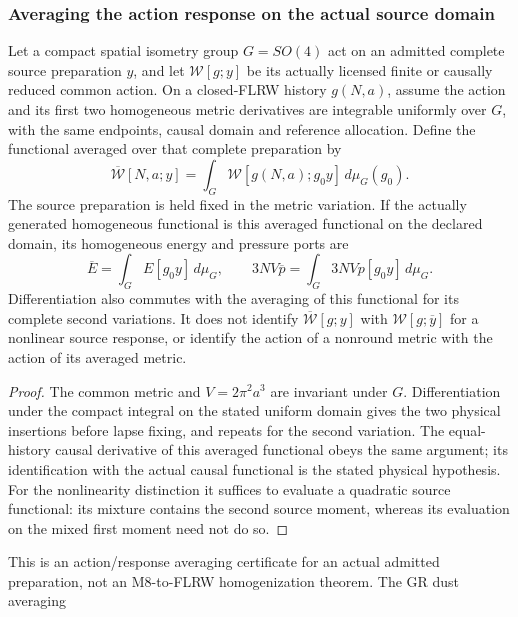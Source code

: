 \documentclass[12pt,a4paper]{article}
\begin{document}
\subsubsection{Averaging the action response on the actual source domain}
\begin{proposition}
\label{p8:prop:v2210-lit-averaging-ports}
Let a compact spatial isometry group $G=SO(4)$ act on an admitted complete
source preparation $y$, and let $\mathcal W[g;y]$ be its actually licensed
finite or causally reduced common action. On a closed-FLRW history $g(N,a)$,
assume the action and its first two homogeneous metric derivatives are
integrable uniformly over $G$, with the same endpoints, causal domain and
reference allocation. Define the functional averaged over that complete
preparation by
\[
 \overline{\mathcal W}[N,a;y]
       =\int_G\mathcal W[g(N,a);g_0y]\,d\mu_G(g_0).
\]
The source preparation is held fixed in the metric variation. If the
actually generated homogeneous functional is this averaged functional on
the declared domain, its homogeneous energy and pressure ports are
\begin{equation}
\label{p8:eq:v2210-lit-averaged-ports}
 \boxed{\overline E=\int_GE[g_0y]\,d\mu_G,
 \qquad 3NV\overline p=\int_G3NVp[g_0y]\,d\mu_G.}
\end{equation}
Differentiation also commutes with the averaging of this functional for
its complete second variations. It does
not identify $\overline{\mathcal W}[g;y]$ with
$\mathcal W[g;\overline y]$ for a nonlinear source response, or identify
the action of a nonround metric with the action of its averaged metric.
\end{proposition}
\begin{proof}
The common metric and $V=2\pi^2a^3$ are invariant under $G$. Differentiation
under the compact integral on the stated uniform domain gives the two
physical insertions before lapse fixing, and repeats for the second
variation. The equal-history causal derivative of this averaged functional
obeys the same argument; its identification with the actual causal
functional is the stated physical hypothesis.
For the nonlinearity distinction it suffices to evaluate a quadratic
source functional: its mixture contains the second source moment, whereas
its evaluation on the mixed first moment need not do so.
\end{proof}
This is an action/response averaging certificate for an actual admitted
preparation, not an M8-to-FLRW homogenization theorem. The GR dust averaging
\end{document}
